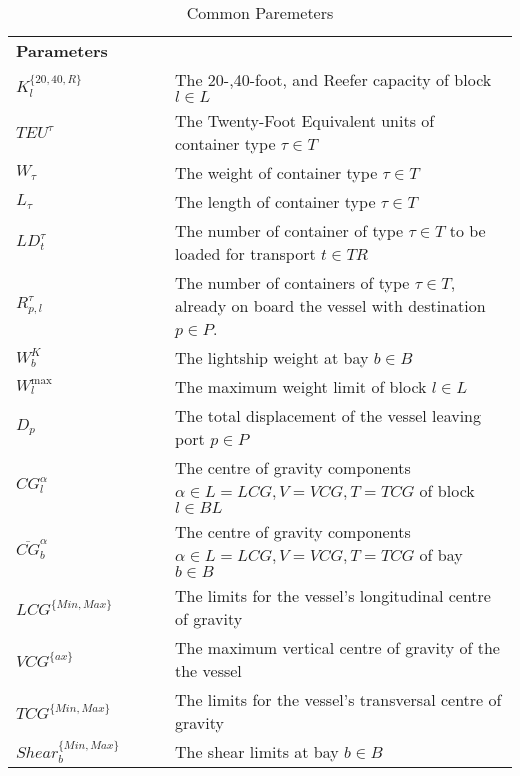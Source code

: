 \documentclass[preprint,12pt,authoryear]{elsarticle}
\begin{document}
\begin{table}[!h]
    \centering
    \begin{tabularx}{\textwidth}{lX}
        \multicolumn{2}{l}{{\bf Parameters}}\\
        $K^{\{20,40,R\}}_l$ & The 20-,40-foot, and Reefer capacity of block $l\in L$\\
        $TEU^\tau$ & The Twenty-Foot Equivalent units of container type $\tau \in T$\\
        $W_\tau$ & The weight of container type $\tau \in T$\\
        $L_\tau$ & The length of container type $\tau \in T$\\
        $LD^{\tau}_t$ & The number of container of type $\tau \in T$ to be loaded for transport $t\in TR$\\
        $R^\tau_{p,l}$ & The number of containers of type $\tau \in T$, already on board the vessel with destination $p\in P$.\\
        $W^K_b$ & The lightship weight at bay $b\in B$\\
        $W^{\max}_l$ & The maximum weight limit of block $l\in L$\\
        $D_p$ & The total displacement of the vessel leaving port $p\in P$\\
        $CG^{\alpha}_l$ & The centre of gravity components $\alpha \in {L=LCG, V=VCG, T=TCG}$ of block $l \in BL$\\
        $\overline{CG}^{\alpha}_b$ & The centre of gravity components $\alpha \in {L=LCG, V=VCG, T=TCG}$ of bay $b \in B$\\
        $LCG^{\{Min,Max\}}$ & The limits for the vessel's longitudinal centre of gravity\\
        $VCG^{\{ax\}}$ & The maximum vertical centre of gravity of the the vessel\\
        $TCG^{\{Min,Max\}}$ & The limits for the vessel's transversal centre of gravity\\
        $Shear^{\{Min,Max\}}_b~\quad~\quad$ & The shear limits at bay $b\in B$\\
    \end{tabularx}
    \caption{Common Paremeters}
    \label{tab:generalNotationPar}
\end{table}
\clearpage
\end{document}
